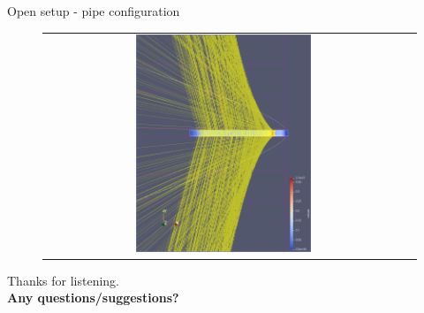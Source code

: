 \documentclass[aspectratio=43,t]{beamer}
\begin{document}
\begin{frame}[fragile]{Open setup - pipe configuration}
\begin{figure}
{\begin{tabular}{c c}
            \includegraphics[width=0.5\textwidth]{images/open_pipe/4.png} \\
        \end{tabular}
		}
    \end{figure}
    \end{frame}




  { %
    \begin{frame}[c,noframenumbering]
      \begin{center}
        Thanks for listening.\\
        {\bf Any questions/suggestions?}
      \end{center}
    \end{frame}
  }
	
\end{document}
